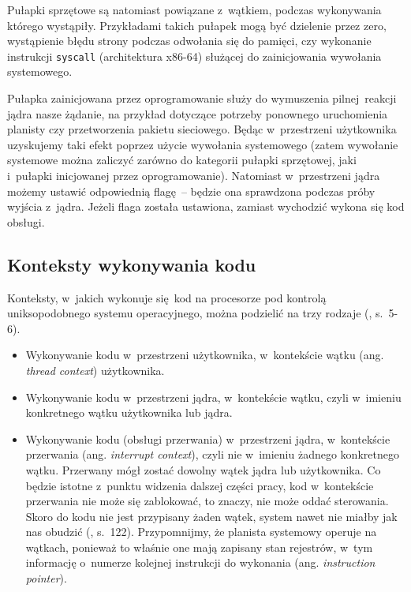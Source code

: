 \documentclass[shortabstract]{iithesis}
\theoremstyle{definition} \newtheorem*{definition}{Definicja}
\theoremstyle{definition} \newtheorem*{example}{Przykład}
\theoremstyle{definition} \newtheorem*{remark}{Uwaga}
\begin{document}
Pułapki sprzętowe są natomiast powiązane z~wątkiem, podczas wykonywania którego wystąpiły. Przykładami
takich pułapek mogą być dzielenie przez zero, wystąpienie błędu strony podczas odwołania się do pamięci, czy
wykonanie instrukcji \texttt{syscall} (architektura x86-64) służącej do zainicjowania
wywołania systemowego.

Pułapka zainicjowana przez oprogramowanie służy do wymuszenia pilnej reakcji jądra nasze żądanie, na przykład
dotyczące potrzeby ponownego uruchomienia planisty czy przetworzenia pakietu sieciowego. Będąc w~przestrzeni
użytkownika uzyskujemy taki efekt poprzez użycie wywołania systemowego (zatem wywołanie systemowe można zaliczyć
zarówno do kategorii pułapki sprzętowej, jaki i~pułapki inicjowanej przez oprogramowanie). Natomiast w~przestrzeni
jądra możemy ustawić odpowiednią flagę~-- będzie ona sprawdzona podczas próby wyjścia z~jądra.
Jeżeli flaga została ustawiona, zamiast wychodzić wykona się kod obsługi.

\subsection{Konteksty wykonywania kodu}

Konteksty, w~jakich wykonuje się kod na procesorze pod kontrolą uniksopodobnego systemu operacyjnego, można
podzielić na trzy rodzaje (\cite{bib:lkd}, s.~5-6).

\begin{itemize}
\item Wykonywanie kodu w~przestrzeni użytkownika, w~kontekście wątku (ang. \textit{thread context}) użytkownika.
\item Wykonywanie kodu w~przestrzeni jądra, w~kontekście wątku, czyli
w~imieniu konkretnego wątku użytkownika lub jądra.
\item Wykonywanie kodu (obsługi przerwania) w~przestrzeni jądra, w~kontekście przerwania (ang.
\textit{interrupt context}), czyli nie w~imieniu żadnego konkretnego wątku.
Przerwany mógł zostać dowolny wątek jądra lub użytkownika. Co będzie istotne z~punktu widzenia dalszej
części pracy, kod w~kontekście przerwania nie może się zablokować, to znaczy, nie może oddać sterowania.
Skoro do kodu nie jest
przypisany żaden wątek, system nawet nie miałby jak nas obudzić (\cite{bib:lkd}, s.~122).
Przypomnijmy, że planista systemowy operuje na wątkach, ponieważ to właśnie one mają zapisany stan rejestrów,
w~tym informację o~numerze kolejnej instrukcji do wykonania (ang. \textit{instruction pointer}).
\end{itemize}
\end{document}
